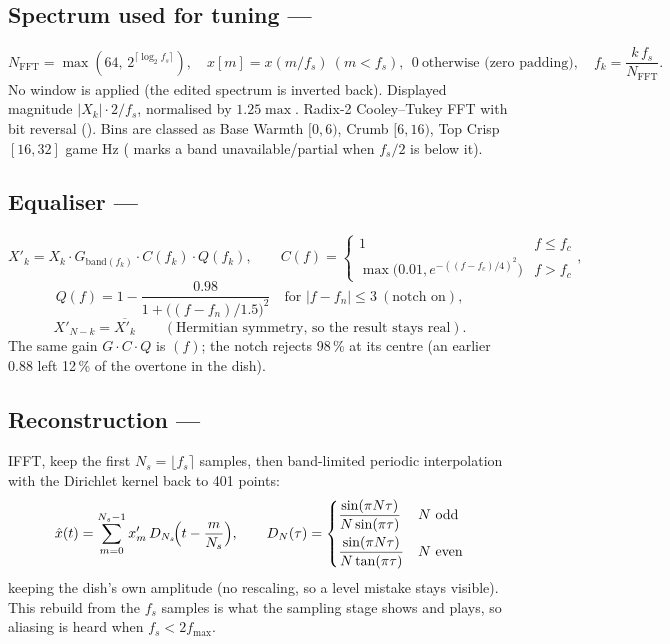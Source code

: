 \documentclass[11pt,a4paper]{article}
\begin{document}
\subsection{Spectrum used for tuning --- }
\[
N_{\text{FFT}}=\max(64,\,2^{\lceil\log_2 f_s\rceil}),\quad
x[m]=x(m/f_s)\ (m<f_s),\ \ 0\ \text{otherwise (zero padding)},\quad
f_k=\frac{k\,f_s}{N_{\text{FFT}}}.
\]
No window is applied (the edited spectrum is inverted back). Displayed magnitude
$|X_k|\cdot 2/f_s$, normalised by $1.25\max$. Radix-2 Cooley--Tukey FFT with bit reversal
(). Bins are classed as Base Warmth $[0,6)$, Crumb $[6,16)$, Top Crisp
$[16,32]$ game Hz ( marks a band unavailable/partial when
$f_s/2$ is below it).

\subsection{Equaliser --- }
\[
X'_k=X_k\cdot G_{\text{band}(f_k)}\cdot C(f_k)\cdot Q(f_k),\qquad
C(f)=\begin{cases}1&f\le f_c\\ \max\!\bigl(0.01,e^{-((f-f_c)/4)^2}\bigr)&f>f_c\end{cases},
\]
\[
Q(f)=1-\frac{0.98}{1+\bigl((f-f_n)/1.5\bigr)^2}\quad\text{for }|f-f_n|\le3\ (\text{notch on}),
\]
\[
X'_{N-k}=\overline{X'_k}\qquad(\text{Hermitian symmetry, so the result stays real}).
\]
The same gain $G\cdot C\cdot Q$ is $(f)$; the notch rejects 98\,\% at its centre
(an earlier 0.88 left 12\,\% of the overtone in the dish).

\subsection{Reconstruction --- }
IFFT, keep the first $N_s=\lfloor f_s\rceil$ samples, then band-limited periodic interpolation
with the Dirichlet kernel back to 401 points:
\[
\hat x(t)=\sum_{m=0}^{N_s-1}x'_m\,D_{N_s}\!\Bigl(t-\frac{m}{N_s}\Bigr),\qquad
D_N(\tau)=\begin{cases}\dfrac{\sin(\pi N\tau)}{N\sin(\pi\tau)} & N\ \text{odd}\\[8pt]
\dfrac{\sin(\pi N\tau)}{N\tan(\pi\tau)} & N\ \text{even}\end{cases}
\]
keeping the dish's own amplitude (no rescaling, so a level mistake stays visible). This
rebuild from the $f_s$ samples is what the sampling stage shows and plays, so aliasing is
heard when $f_s<2f_{\max}$.
\end{document}
